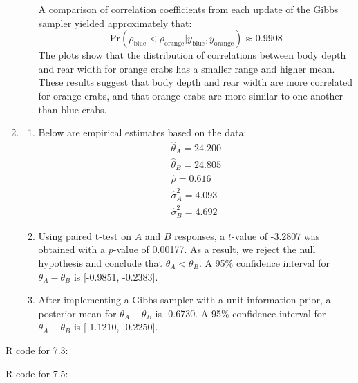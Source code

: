 \documentclass{article}
\begin{document}
\begin{enumerate}[7.1]
\begin{enumerate}[(a)]
		A comparison of correlation coefficients from each update of the Gibbs sampler yielded approximately that:
		 $$\text{Pr}(\rho_{\text{blue}}<\rho_{\text{orange}}|y_{\text{blue}}, y_{\text{orange}}) \approx 0.9908$$
		 The plots show that the distribution of correlations between body depth and rear width for orange crabs has a smaller range and higher mean. These results suggest that body depth and rear width are more correlated for orange crabs, and that orange crabs are more similar to one another than blue crabs.
		
	\end{enumerate}
	
	\setcounter{enumi}{4}
	\item
	\begin{enumerate}
		\item Below are empirical estimates based on the data:
		\begin{align*}
			\hat{\theta}_A = 24.200 \\
			\hat{\theta}_B = 24.805 \\
			\hat{\rho} = 0.616 \\
			\hat{\sigma}_A^2 = 4.093 \\
			\hat{\sigma}_B^2 = 4.692
		\end{align*}
		
		\item Using paired t-test on $A$ and $B$ responses, a $t$-value of -3.2807 was obtained with a $p$-value of 0.00177. As a result, we reject the null hypothesis and conclude that $\theta_A<\theta_B$. A 95\% confidence interval for $\theta_A-\theta_B$ is [-0.9851, -0.2383].
		
		\item After implementing a Gibbs sampler with a unit information prior, a posterior mean for $\theta_A-\theta_B$ is -0.6730. A 95\% confidence interval for $\theta_A-\theta_B$ is [-1.1210, -0.2250].
	\end{enumerate}
\end{enumerate}

\pagebreak
R code for 7.3:

\pagebreak
R code for 7.5:
\end{document}
